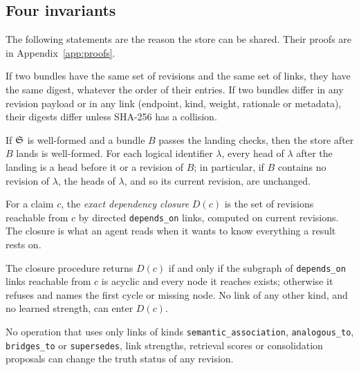 \subsection{Four invariants}

The following statements are the reason the store can be shared. Their proofs are in Appendix~\ref{app:proofs}.

\begin{proposition}\label{prop:order}
If two bundles have the same set of revisions and the same set of links, they have the same digest, whatever the order of their entries. If two bundles differ in any revision payload or in any link (endpoint, kind, weight, rationale or metadata), their digests differ unless SHA-256 has a collision. 
\end{proposition}

\begin{proposition}\label{prop:wellformed}
If $\mathfrak{S}$ is well-formed and a bundle $B$ passes the landing checks, then the store after $B$ lands is well-formed. For each logical identifier $\lambda$, every head of $\lambda$ after the landing is a head before it or a revision of $B$; in particular, if $B$ contains no revision of $\lambda$, the heads of $\lambda$, and so its current revision, are unchanged. 
\end{proposition}

For a claim $c$, the \emph{exact dependency closure} $D(c)$ is the set of revisions reachable from $c$ by directed \texttt{depends\_on} links, computed on current revisions. The closure is what an agent reads when it wants to know everything a result rests on.

\begin{proposition}\label{prop:closure}
The closure procedure returns $D(c)$ if and only if the subgraph of \texttt{depends\_on} links reachable from $c$ is acyclic and every node it reaches exists; otherwise it refuses and names the first cycle or missing node. No link of any other kind, and no learned strength, can enter $D(c)$. 
\end{proposition}

\begin{proposition}\label{prop:assoc}
No operation that uses only links of kinds \texttt{semantic\_association}, \texttt{analogous\_to}, \texttt{bridges\_to} or \texttt{supersedes}, link strengths, retrieval scores or consolidation proposals can change the truth status of any revision. 
\end{proposition}

